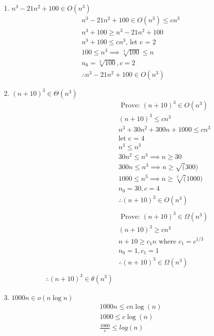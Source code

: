 \documentclass[12pt]{article}
\begin{document}
\begin{enumerate}
\item 
  $n^3 - 21n^2 +100 \in O(n^3)$\\
  \begin{align*}
    &n^3 - 21n^2 +100 \in O(n^3) \leq cn^3\\
    &n^3 + 100 \geq n^3 - 21n^2 + 100\\
    &n^3 + 100 \leq cn^3\text{,     let c = 2}\\
    &100 \leq n^3 \implies \sqrt[3]{100} \leq n\\
    &n_{0} = \sqrt[3]{100}, c = 2\\
    &\therefore n^3 - 21n^2 +100 \in O(n^3)
  \end{align*}
\item $ (n + 10)^3 \in \Theta(n^3)$\\
  \begin{align*}
    &\text{ Prove: } (n+10)^3 \in O(n^3)\\
    &(n+10)^3 \leq cn^3\\
    &n^3 + 30n^2 + 300n + 1000 \leq cn^3\\
    &\text{let c = 4}\\
    &n^3 \leq n^3\\
    &30n^2 \leq n^3 \implies n \geq 30\\
    &300n \leq n^3 \implies n \geq \sqrt(300)\\
    &1000 \leq n^3 \implies n \geq \sqrt[3](1000)\\
    &n_{0} = 30, c = 4\\
    &\therefore (n+10)^3 \in O({n^3})  \\
    \\
    &\text{ Prove: } (n+10)^3 \in \Omega(n^3)\\
    &(n+10)^3 \geq cn^3\\
    &n+10 \geq c_1n \text{ where } c_1 = c^{1/3}\\
    &n_{0} = 1, c_1 = 1\\
    &\therefore (n+10)^3 \in \Omega({n^3})  \\
    \\
    \therefore (n+10)^3 \in \theta({n^3})
  \end{align*}
\item
  $1000n \in o(n \log n)$\\
  \begin{align*}
    &1000n \leq cn\log(n)\\
    &1000 \leq c\log(n)\\
    &\frac{1000}{c} \leq log(n)\\

\end{align*}
\end{enumerate}
\end{document}
